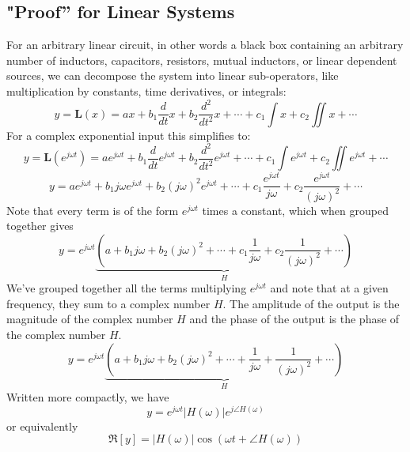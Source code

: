 \subsection{"Proof'' for Linear Systems}
For an arbitrary linear circuit, in other words a black box containing an arbitrary number of inductors, capacitors, resistors, mutual inductors, or linear dependent sources, we can  decompose the system into linear sub-operators, like multiplication by constants, time derivatives, or integrals:
    \begin{equation}
        y = \mathbf{L}(x) = a x + b_1 \frac{d}{dt} x + b_2\frac{d^2}{dt^2} x + \cdots + c_1 \int x + c_2 \iint x + \cdots
    \end{equation}
For a complex exponential input this simplifies to:
    \begin{equation}
        y  = \mathbf{L}(e^{j\omega t}) = a e^{j\omega t} + b_1 \frac{d}{dt} e^{j\omega t} + b_2\frac{d^2}{dt^2} e^{j\omega t} + \cdots + c_1 \int e^{j\omega t} + c_2 \iint e^{j\omega t} + \cdots
    \end{equation}
    \begin{equation}
        y  = a e^{j\omega t} + b_1 j\omega e^{j\omega t} + b_2 ( j\omega)^2 e^{j\omega t} + \cdots + c_1 \frac{e^{j\omega t}}{ j\omega} + c_2 \frac{e^{j\omega t}}{ (j\omega)^2} + \cdots
    \end{equation}
Note that every term is of the form $e^{j\omega t}$ times a constant, which when grouped together gives
    \begin{equation}
        y =  e^{j\omega t} \underbrace{\left(a  + b_1 j\omega  + b_2 ( j\omega)^2 + \cdots + c_1 \frac{1}{ j\omega} + c_2 \frac{1}{ (j\omega)^2}  + \cdots \right)}_{H}
    \end{equation}
We've grouped together all the terms multiplying $e^{j\omega t}$ and note that at a given frequency, they sum to a complex number $H$.    The amplitude of the output is the magnitude of the complex number $H$ and the phase of the output is the phase of the complex number $H$.
    \begin{equation}
        y =  e^{j\omega t} \underbrace{\left(a  + b_1 j\omega + b_2 ( j\omega)^2 + \cdots + \frac{1}{ j\omega} + \frac{1}{ (j\omega)^2}  + \cdots \right)}_{H}
    \end{equation}
Written more compactly, we have
    \begin{equation}
        y = e^{j\omega t} |H(\omega)| e^{j\angle H(\omega)}
    \end{equation}
or equivalently
    \begin{equation}
        \Re[ y ] =  |H(\omega)| \cos ( \omega t + \angle H(\omega))
    \end{equation}
